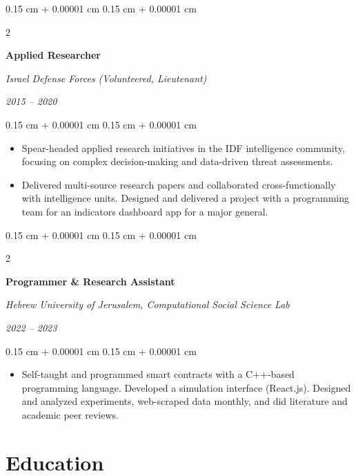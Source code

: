 \documentclass[10pt, letterpaper]{article}
\newenvironment{highlights}{
    \begin{itemize}[
        topsep=0.08 cm,
        parsep=0.08 cm,
        partopsep=0pt,
        itemsep=0pt,
        leftmargin=0.25 cm + 10pt
    ]
}{
    \end{itemize}
} %
\newenvironment{onecolentry}{
    \begin{adjustwidth}{
        0.15 cm + 0.00001 cm
    }{
        0.15 cm + 0.00001 cm
    }
}{
    \end{adjustwidth}
} %
\newenvironment{twocolentry}[2][]{
    \onecolentry
    \def\secondColumn{#2}
    \setcolumnwidth{\fill, 4.5 cm}
    \begin{paracol}{2}
}{
    \switchcolumn \raggedleft \secondColumn
    \end{paracol}
    \endonecolentry
} %
\begin{document}
        \begin{twocolentry}{
            
            
        \textit{2015 – 2020}}
            \textbf{Applied Researcher}
            
            \textit{Israel Defense Forces (Volunteered, Lieutenant)}
        \end{twocolentry}

        \vspace{0.08 cm}
        \begin{onecolentry}
            \begin{highlights}
                \item Spear-headed applied research initiatives in the IDF intelligence community, focusing on complex decision-making and data-driven threat assessments.
                \item Delivered multi-source research papers and collaborated cross-functionally with intelligence units. Designed and delivered a project with a programming team for an indicators dashboard app for a major general.
            \end{highlights}
        \end{onecolentry}


        \vspace{0.15 cm}

        \begin{twocolentry}{
            
            
        \textit{2022 – 2023}}
            \textbf{Programmer \& Research Assistant}
            
            \textit{Hebrew University of Jerusalem, Computational Social Science Lab}
        \end{twocolentry}

        \vspace{0.08 cm}
        \begin{onecolentry}
            \begin{highlights}
                \item Self-taught and programmed smart contracts with a C++-based programming language. Developed a simulation interface (React.js). Designed and analyzed experiments, web-scraped data monthly, and did literature and academic peer reviews.
            \end{highlights}
        \end{onecolentry}



    
    \section{Education}
\end{document}
